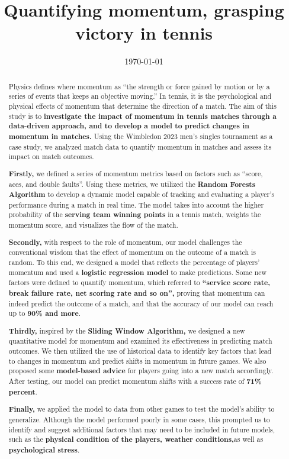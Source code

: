 \documentclass{mcmthesis}
\title{\bf Quantifying momentum, grasping victory in tennis}
\date{\today}
\begin{document}
\begin{abstract}

Physics defines where momentum as “the strength or force gained by motion or by a series of
events that keeps an objective moving.” In tennis, it is the psychological and physical effects of
momentum that determine the direction of a match. The aim of this study is to {\bf investigate the
impact of momentum in tennis matches through a data-driven approach, and to develop a
model to predict changes in momentum in matches.} Using the Wimbledon 2023 men's singles
tournament as a case study, we analyzed match data to quantify momentum in matches and assess
its impact on match outcomes. 

{\bf Firstly,} we defined a series of momentum metrics based on factors such as “score, aces, and
double faults”. Using these metrics, we utilized the {\bf Random Forests Algorithm} to develop a
dynamic model capable of tracking and evaluating a player's performance during a match in real
time. The model takes into account the higher probability of the {\bf serving team winning points} in a
tennis match, weights the momentum score, and visualizes the flow of the match. 

{\bf Secondly,} with respect to the role of momentum, our model challenges the conventional
wisdom that the effect of momentum on the outcome of a match is random. To this end, we
designed a model that reflects the percentage of players' momentum and used a {\bf logistic regression
model} to make predictions. Some new factors were defined to quantify momentum, which
referred to {\bf “service score rate, break failure rate, net scoring rate and so on”,} proving that
momentum can indeed predict the outcome of a match, and that the accuracy of our model can
reach up to {\bf 90\% and more}.

{\bf Thirdly,} inspired by the {\bf Sliding Window Algorithm,} we designed a new quantitative model
for momentum and examined its effectiveness in predicting match outcomes. We then utilized the
use of historical data to identify key factors that lead to changes in momentum and predict shifts in
momentum in future games. We also proposed some {\bf model-based advice} for players going into a
new match accordingly. After testing, our model can predict momentum shifts with a success rate
of {\bf 71\% percent}. 

{\bf Finally,} we applied the model to data from other games to test the model's ability to
generalize. Although the model performed poorly in some cases, this prompted us to identify and
suggest additional factors that may need to be included in future models, such as the {\bf physical
condition of the players, weather conditions,}as well as {\bf psychological stress}. 


\end{abstract}
\end{document}
